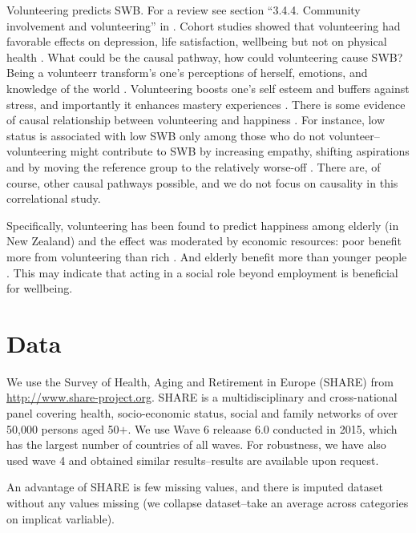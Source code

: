 \documentclass[10pt, letterpaper]{article}
\begin{document}
\begin{spacing}{1.4}
%
 Volunteering predicts SWB. For a review see section 
 ``3.4.4. Community involvement and volunteering'' in \citet{dolan08al}. Cohort
 studies showed that volunteering had favorable effects on depression, life
 satisfaction, wellbeing but not on physical health \citep{jenkinson2013volunteering}.
%
What could be the causal pathway, how could volunteering cause SWB? Being a
volunteerr transform's one's perceptions of herself, emotions, and knowledge of
the world \citep{wilson12B}. %
Volunteering boosts one's self esteem and buffers against stress, and
importantly it enhances mastery experiences
\citep{wilson12B}. %
%
 There is  some evidence of causal relationship between volunteering and
 happiness \citep{meier2008volunteering,borgonovi2008doing}. For instance, low status is associated
with low SWB only among those who do not volunteer--volunteering
might contribute to SWB by increasing empathy, shifting aspirations and by
moving the reference group to the relatively worse-off
\citep{borgonovi2008doing}. There are, of course, other causal pathways
possible, and we do not focus on causality in this correlational study.

Specifically, volunteering has been found to predict happiness among elderly (in
New Zealand) and the effect was moderated by
economic resources: poor benefit more from volunteering than rich
\citep{dulin2012volunteering}. And elderly benefit more than  younger people
\citep{van2000differential,wahrendorf06}. This may indicate that acting in
a social role beyond employment is beneficial for wellbeing.


\section{Data} 

We use the Survey of Health, Aging and Retirement in Europe (SHARE) from
\url{http://www.share-project.org}.
 SHARE is a multidisciplinary and
cross-national panel covering health, socio-economic status,
social and family networks of over 50,000 persons aged 50$+$. 
We use  %
 Wave 6 releaase 6.0
 conducted  in 2015, which has the largest number of
countries of all waves. 
%
For robustness, we have also used wave 4 and obtained similar results--results
are available upon request.  


An advantage of SHARE is few missing values, 
 and there is imputed dataset without any values missing (we collapse dataset--take an average across categories on implicat varliable). %


\end{spacing}
\end{document}

